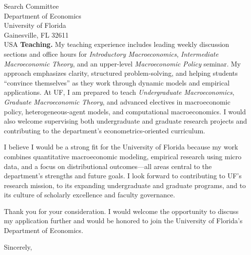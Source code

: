 \documentclass[11pt,letterpaper]{letter}
\begin{document}
\begin{letter}{Search Committee \\
Department of Economics \\
University of Florida \\
Gainesville, FL 32611 \\ USA}
\textbf{Teaching.} My teaching experience includes leading weekly discussion sections and office hours for \textit{Introductory Macroeconomics}, \textit{Intermediate Macroeconomic Theory}, and an upper-level \textit{Macroeconomic Policy} seminar. My approach emphasizes clarity, structured problem-solving, and helping students “convince themselves” as they work through dynamic models and empirical applications. At UF, I am prepared to teach \textit{Undergraduate Macroeconomics}, \textit{Graduate Macroeconomic Theory}, and advanced electives in macroeconomic policy, heterogeneous-agent models, and computational macroeconomics. I would also welcome supervising both undergraduate and graduate research projects and contributing to the department’s econometrics-oriented curriculum.

I believe I would be a strong fit for the University of Florida because my work combines quantitative macroeconomic modeling, empirical research using micro data, and a focus on distributional outcomes—all areas central to the department’s strengths and future goals. I look forward to contributing to UF’s research mission, to its expanding undergraduate and graduate programs, and to its culture of scholarly excellence and faculty governance.

Thank you for your consideration. I would welcome the opportunity to discuss my application further and would be honored to join the University of Florida’s Department of Economics.

\closing{Sincerely,}

\end{letter}
\end{document}
